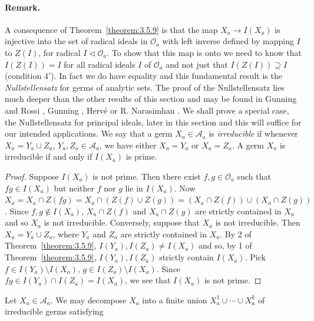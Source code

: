 \paragraph*{Remark.} A consequence of Theorem~\ref{theorem:3.5.9} is that the map $X_a\to I(X_a)$ is injective into the set of radical ideals in $\mathcal O_a$ with left inverse defined by mapping $I$ to $Z(I)$, for radical $I\lhd\mathcal O_a$. To show that this map is onto we need to know that $I(Z(I))=I$ for all radical ideals $I$ of $\mathcal O_a$ and not just that $I(Z(I))\supseteq I$ (condition $4'$). In fact we do have equality and this fundamental result is the \emph{Nullstellensatz}
for germs of analytic sets. The proof of the Nullstellensatz lies much deeper than the other results of this section and may be found in Gunning and Rossi \cite{bib:I:gunning-r-c-and-rossi-h:1}, Gunning \cite{bib:I:gunning-r-c:1}, Herv\'e \cite{bib:I:herve-m:1} or R. Narasimhan \cite{bib:I:narasimhan-r:3}. We shall prove a special case, the Nullstellensatz for principal ideals, later in this section and this will suffice for our intended applications.
 We say that a germ $X_a\in\mathcal A_a$ is \emph{irreducible} if whenever $X_a=Y_a\cup Z_a$, $Y_a,Z_a\in\mathcal A_a$, we have either $X_a=Y_a$ or $X_a=Z_a$.
 A germ $X_a$ is irreducible if and only if $I(X_a)$ is prime.
\begin{proof}
Suppose $I(X_a)$ is not prime. Then there exist $f,g\in\mathcal O_a$ such that $fg\in I(X_a)$ but neither $f$ nor $g$ lie in $I(X_a)$. Now $X_a=X_a\cap Z(fg)=X_a\cap(Z(f)\cup Z(g))=(X_a\cap Z(f))\cup(X_a\cap Z(g))$. Since $f,g\notin I(X_a)$, $X_a\cap Z(f)$ and $X_a\cap Z(g)$ are strictly contained in $X_a$ and so $X_a$ is not irreducible. Conversely, suppose that $X_a$ is not irreducible. Then $X_a=Y_a\cup Z_a$, where $Y_a$ and $Z_a$ are strictly contained in $X_a$. By 2 of Theorem~\ref{theorem:3.5.9}, $I(Y_a),I(Z_a)\ne I(X_a)$ and so, by 1 of Theorem~\ref{theorem:3.5.9}, $I(Y_a),I(Z_a)$ strictly contain $I(X_a)$. Pick $f\in I(Y_a)\setminus I(X_a)$, $g\in I(Z_a)\setminus I(X_a)$. Since $fg\in I(Y_a)\cap I(Z_a)=I(X_a)$, we see that $I(X_a)$ is not prime.
\end{proof}
 Let $X_a\in\mathcal A_a$. We may decompose $X_a$ into a finite union $X_a^1\cup\cdots\cup X_a^k$ of irreducible germs satisfying
